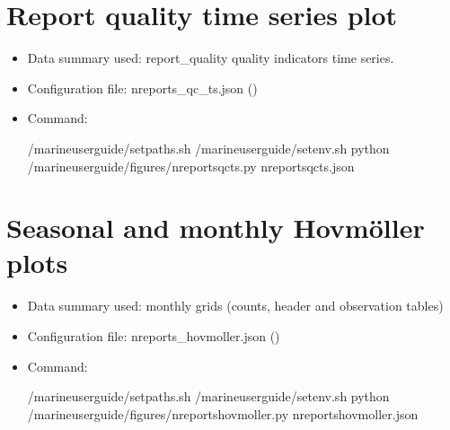 \documentclass[letterpaper,10pt,english]{sphinxmanual}
\begin{document}
\section{Report quality time series plot}
\label{\detokenize{index:report-quality-time-series-plot}}\begin{itemize}
\item {} 
Data summary used: report\_quality quality indicators time series.

\item {} 
Configuration file: nreports\_qc\_ts.json ({\hyperref[\detokenize{index:nreports-qc-ts-config}]{}})

\item {} 
Command:

\begin{sphinxVerbatim}[commandchars=\\\{\}]
 /marine\PYGZhy{}user\PYGZhy{}guide/setpaths.sh
 /marine\PYGZhy{}user\PYGZhy{}guide/setenv.sh
python /marine\PYGZhy{}user\PYGZhy{}guide/figures/nreports\PYGZus{}qc\PYGZus{}ts.py nreports\PYGZus{}qc\PYGZus{}ts.json
\end{sphinxVerbatim}

\end{itemize}


\section{Seasonal and monthly Hovmöller plots}
\label{\detokenize{index:seasonal-and-monthly-hovmoller-plots}}\begin{itemize}
\item {} 
Data summary used: monthly grids (counts, header and observation tables)

\item {} 
Configuration file: nreports\_hovmoller.json ({\hyperref[\detokenize{index:nreports-hovmoller-config}]{}})

\item {} 
Command:

\begin{sphinxVerbatim}[commandchars=\\\{\}]
 /marine\PYGZhy{}user\PYGZhy{}guide/setpaths.sh
 /marine\PYGZhy{}user\PYGZhy{}guide/setenv.sh
python /marine\PYGZhy{}user\PYGZhy{}guide/figures/nreports\PYGZus{}hovmoller.py nreports\PYGZus{}hovmoller.json
\end{sphinxVerbatim}

\end{itemize}
\end{document}
